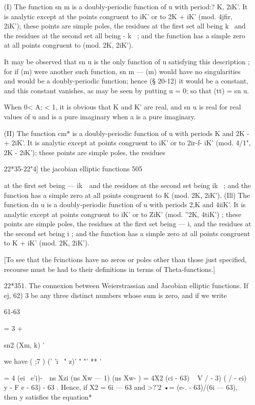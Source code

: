 (I) The function sn m is a doubly-periodic function of u with period:?
K, 2iK'. It is analytic except at the points congruent to iK' or to 2K
+ iK' (mod. 4jfir, 2iK'); these points are simple poles, the residues
at the first set all being k~ and the residues at the second set all
being - k~ ; and the function has a simple zero at all points
congruent to (mod. 2K, 2iK').

It may be observed that sn u is the only function of u satisfying this
description ; for if (m) were another such function, sn m — (m) would
have no singularities and would be a doubly-periodic function; hence
(§ 20-12) it would be a constant, and this constant vanishes, as may
be seen by putting u = 0; so that (tt) = sn u.

When 0< A; < 1, it is obvious that K and K' are real, and sn u is real
for real values of u and is a pure imaginary when a is a pure
imaginary.

(II) The function cm* is a doubly-periodic function of u with periods
K and 2K -+ 2iK'. It is analytic except at points congruent to iK' or
to 2ir-f- iK' (mod. 4/1", 2K - 2iK'); these points are simple poles,
the residues

22*35-22"4] the jacobian elliptic functions 505

at the first set being — ik~\ and the residues at the second set being
ik~ ; and the function has a simple zero at all points congruent to K
(mod. 2K, 2iK'). (Ill) The function dn u is a doubly-periodic function
of u with periods 2,K and 4iiK'. It is analytic except at points
congruent to iK' or to ZiK' (mod. ''2K, 4tiK') ; these points are
simple poles, the residues at the first set being — i, and the
residues at the second set being i ; and the function has a simple
zero at all points congruent to K + iK' (mod. 2K, 2iK').

[To see that the fvinctions have no zeros or poles other than those
just specified, recourse must be had to their definitions in terms of
Theta-functions.]

22*351. The connexion between Weierstrassian and Jacobian elliptic
functions. If ej, 62) 3 be any three distinct numbers whose sum is
zero, and if we write

61-63

  = 3 +

sn2 (Xm, k) '

we have ( ;7 ) (' 'i ~" z)' " "' ** '

= 4 (ei ~e'i)-\ \ ns Xzi (ns Xw — 1) (ns Xw- ) = 4X2 (ci - 63) ~ V / -
3) ( / - ei) y - F e - 63) - 63 . Hence, if X2 = 6i — 63 and >?'2 •=
(e-. - 63)/(6i — 63), then y satisfies the equation*


